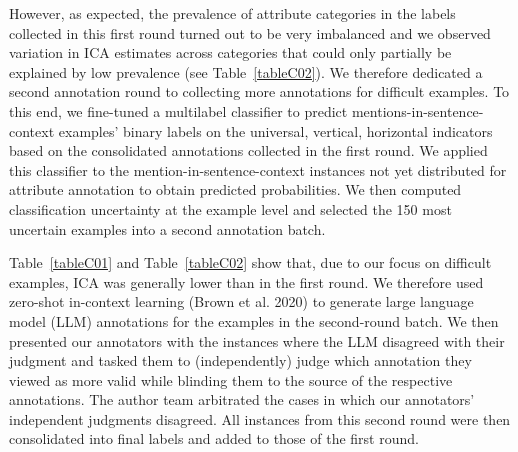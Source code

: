 \documentclass[12pt]{article}
\begin{document}
However, as expected, the prevalence of attribute categories in the labels collected in this first round turned out to be very imbalanced and we observed variation in ICA estimates across categories that could only partially be explained by low prevalence (see Table~\ref{tableC02}).
We therefore dedicated a second annotation round to collecting more annotations for difficult examples.
To this end, we fine-tuned a multilabel classifier to predict mentions-in-sentence-context examples' binary labels on the universal, vertical, horizontal indicators based on the consolidated annotations collected in the first round.
We applied this classifier to the mention-in-sentence-context instances not yet distributed for attribute annotation to obtain predicted probabilities.
We then computed classification uncertainty at the example level and selected the 150 most uncertain examples into a second annotation batch.

Table~\ref{tableC01} and Table~\ref{tableC02} show that, due to our focus on difficult examples, ICA was generally lower than in the first round.
We therefore used zero-shot in-context learning (Brown et al. 2020) to generate large language model (LLM) annotations for the examples in the second-round batch.
We then presented our annotators with the instances where the LLM disagreed with their judgment and tasked them to (independently) judge which annotation they viewed as more valid while blinding them to the source of the respective annotations.
The author team arbitrated the cases in which our annotators' independent judgments disagreed.
All instances from this second round were then consolidated into final labels and added to those of the first round.

%

%
\end{document}
